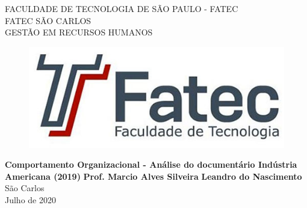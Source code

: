 \documentclass[12pt,a4paper,oneside]{article}
\begin{document}
 

\pagestyle{fancy} %
\renewcommand{\headrulewidth}{0.5pt}
\lhead[\thepage]{} %
\chead{} %
\rhead[]{\thepage} %
\lfoot{} %
\cfoot{} %
\rfoot{} %

\begin{titlepage}
\centering
\textsc{\large FACULDADE DE TECNOLOGIA DE SÃO PAULO - FATEC}\\[0.2cm]
\textsc{\large FATEC SÃO CARLOS}\\[0.2cm]
\textsc{\large GESTÃO EM RECURSOS HUMANOS}\\[0.2cm]
\begin{figure} [H] 
\centering
\includegraphics[scale=0.35]{Fig/Logo Fatec.jpg} 
\end{figure}
\vfill
{ \LARGE \bf Comportamento Organizacional - Análise do documentário Indústria Americana (2019) }
\vfill
{ \large \bf Prof. Marcio Alves Silveira }
\vfill
{ \large \bf Leandro do Nascimento}
\vfill
{\large São Carlos\\Julho de 2020 }
\end{titlepage}
\thispagestyle{empty} %



\newpage
\thispagestyle{empty} %

\cleardoublepage        %
\tableofcontents        %
\end{document}
